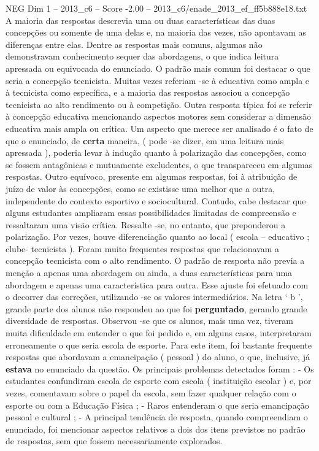 \begin{textsample}{NEG Dim 1 – 2013\_c6 – Score -2.00 – 2013\_c6/enade\_2013\_ef\_ff5b888e18.txt}
A maioria das respostas descrevia uma ou duas características das duas concepções ou somente de uma delas e, na maioria das vezes, não apontavam as diferenças entre elas.
Dentre as respostas mais comuns, algumas não demonstravam conhecimento sequer das abordagens, o que indica leitura apressada ou equivocada do enunciado.
O padrão mais comum foi destacar o que seria a concepção tecnicista.
Muitas vezes referiam -se à educativa como ampla e à tecnicista como específica, e a maioria das respostas associou a concepção tecnicista ao alto rendimento ou à competição.
Outra resposta típica foi se referir à concepção educativa mencionando aspectos motores sem considerar a dimensão educativa mais ampla ou crítica.
Um aspecto que merece ser analisado é o fato de que o enunciado, de \textbf{certa} maneira, ( pode -se dizer, em uma leitura mais apressada ), poderia levar à indução quanto à polarização das concepções, como se fossem antagônicas e mutuamente excludentes, o que transpareceu em algumas respostas.
Outro equívoco, presente em algumas respostas, foi à atribuição de juízo de valor às concepções, como se existisse uma melhor que a outra, independente do contexto esportivo e sociocultural.
Contudo, cabe destacar que alguns estudantes ampliaram essas possibilidades limitadas de compreensão e ressaltaram uma visão crítica.
Ressalte -se, no entanto, que preponderou a polarização.
Por vezes, houve diferenciação quanto ao local ( escola – educativo ; clube- tecnicista ).
Foram muito frequentes respostas que relacionavam a concepção tecnicista com o alto rendimento.
O padrão de resposta não previa a menção a apenas uma abordagem ou ainda, a duas características para uma abordagem e apenas uma característica para outra.
Esse ajuste foi efetuado com o decorrer das correções, utilizando -se os valores intermediários.
Na letra ‘ b ’, grande parte dos alunos não respondeu ao que foi \textbf{perguntado}, gerando grande diversidade de respostas.
Observou -se que os alunos, mais uma vez, tiveram muita dificuldade em entender o que foi pedido e, em alguns casos, interpretaram erroneamente o que seria escola de esporte.
Para este item, foi bastante frequente respostas que abordavam a emancipação ( pessoal ) do aluno, o que, inclusive, já \textbf{estava} no enunciado da questão.
Os principais problemas detectados foram : - Os estudantes confundiram escola de esporte com escola ( instituição escolar ) e, por vezes, comentavam sobre o papel da escola, sem fazer qualquer relação com o esporte ou com a Educação Física ; - Raros entenderam o que seria emancipação pessoal e cultural ; - A principal tendência de resposta, quando compreendiam o enunciado, foi mencionar aspectos relativos a dois dos itens previstos no padrão de respostas, sem que fossem necessariamente explorados.

\end{textsample}

